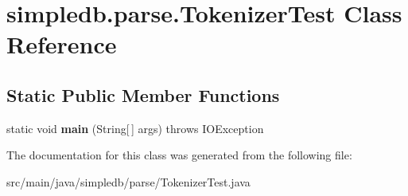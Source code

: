 \hypertarget{classsimpledb_1_1parse_1_1TokenizerTest}{}\section{simpledb.\+parse.\+Tokenizer\+Test Class Reference}
\label{classsimpledb_1_1parse_1_1TokenizerTest}
\subsection*{Static Public Member Functions}
\begin{DoxyCompactItemize}
\item 
\mbox{\label{classsimpledb_1_1parse_1_1TokenizerTest_a228546c2e3fd70ceba77ed5480ecf890}} 
static void {\bfseries main} (String\mbox{[}$\,$\mbox{]} args)  throws I\+O\+Exception 
\end{DoxyCompactItemize}


The documentation for this class was generated from the following file\+:\begin{DoxyCompactItemize}
\item 
src/main/java/simpledb/parse/Tokenizer\+Test.\+java\end{DoxyCompactItemize}
